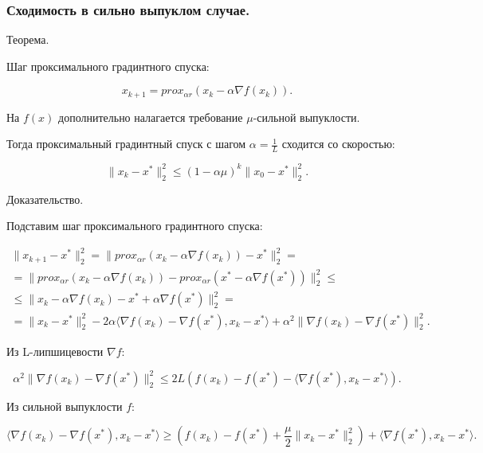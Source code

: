 \subsubsection*{Сходимость в сильно выпуклом случае.}

Теорема.

Шаг проксимального градинтного спуска:

\begin{equation}
    x_{k+1}=prox_{\alpha r}(x_k-\alpha\nabla f(x_k)).
\end{equation}

На $f(x)$ дополнительно налагается требование $\mu$-сильной выпуклости.

Тогда проксимальный градинтный спуск с шагом $\alpha=\frac1L$ сходится со скоростью:

\begin{equation}
    \|x_k-x^*\|_2^2\leq(1-\alpha\mu)^k\|x_0-x^*\|_2^2.
\end{equation}

Доказательство.

Подставим шаг проксимального градинтного спуска:

\begin{equation}
    \begin{aligned}
        \|x_{k+1}-x^*\|_2^2=
        \|prox_{\alpha r}(x_k-\alpha\nabla f(x_k))-x^*\|_2^2=    \\=
        \|prox_{\alpha r}(x_k-\alpha\nabla f(x_k))-
        prox_{\alpha r}(x^*-\alpha\nabla f(x^*))\|_2^2\leq       \\\leq
        \|x_k-\alpha\nabla f(x_k)-x^*+\alpha\nabla f(x^*)\|_2^2= \\=
        \|x_k-x^*\|_2^2-
        2\alpha\langle\nabla f(x_k)-\nabla f(x^*),x_k-x^*\rangle+
        \alpha^2\|\nabla f(x_k)-\nabla f(x^*)\|_2^2.
    \end{aligned}
\end{equation}

Из L-липшицевости $\nabla f$:

\begin{equation}
    \alpha^2\|\nabla f(x_k)-\nabla f(x^*)\|_2^2\leq
    2L\left(f(x_k)-f(x^*)-\langle\nabla f(x^*),x_k-x^*\rangle\right).
\end{equation}

Из сильной выпуклости $f$:

\begin{equation}
    \langle\nabla f(x_k)-\nabla f(x^*),x_k-x^*\rangle\geq
    \left(f(x_k)-f(x^*)+\frac\mu2\|x_k-x^*\|_2^2\right)+\langle\nabla f(x^*),x_k-x^*\rangle.
\end{equation}

